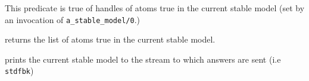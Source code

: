 \begin{description}

%
This predicate is true of handles of atoms true in the current stable
model (set by an invocation of {\tt a\_stable\_model/0}.)


%
returns the list of atoms true in the current stable model.


%
prints the current stable model to the stream to which answers are
sent (i.e {\tt stdfbk})

\end{description}
